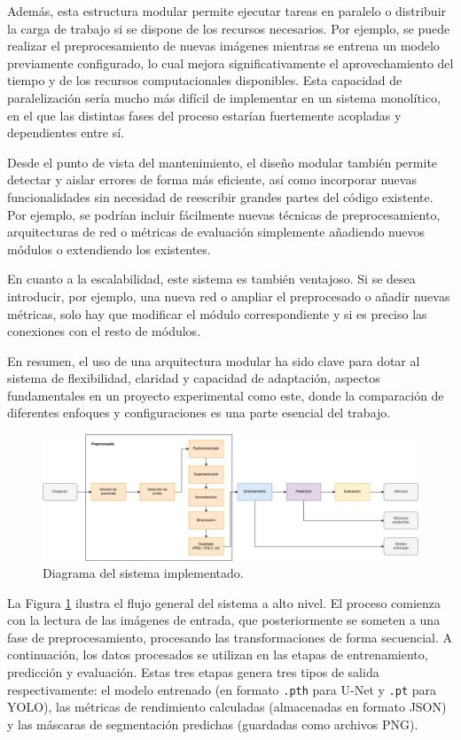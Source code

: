 \documentclass[../main.tex]{subfiles}
\begin{document}
Además, esta estructura modular permite ejecutar tareas en paralelo o distribuir la carga de trabajo si se dispone de los recursos necesarios. Por ejemplo, se puede realizar el preprocesamiento de nuevas imágenes mientras se entrena un modelo previamente configurado, lo cual mejora significativamente el aprovechamiento del tiempo y de los recursos computacionales disponibles. Esta capacidad de paralelización sería mucho más difícil de implementar en un sistema monolítico, en el que las distintas fases del proceso estarían fuertemente acopladas y dependientes entre sí.

Desde el punto de vista del mantenimiento, el diseño modular también permite detectar y aislar errores de forma más eficiente, así como incorporar nuevas funcionalidades sin necesidad de reescribir grandes partes del código existente. Por ejemplo, se podrían incluir fácilmente nuevas técnicas de preprocesamiento, arquitecturas de red o métricas de evaluación simplemente añadiendo nuevos módulos o extendiendo los existentes.

En cuanto a la escalabilidad, este sistema es también ventajoso. Si se desea introducir, por ejemplo, una nueva red o ampliar el preprocesado o añadir nuevas métricas, solo hay que modificar el módulo correspondiente y si es preciso las conexiones con el resto de módulos.

En resumen, el uso de una arquitectura modular ha sido clave para dotar al sistema de flexibilidad, claridad y capacidad de adaptación, aspectos fundamentales en un proyecto experimental como este, donde la comparación de diferentes enfoques y configuraciones es una parte esencial del trabajo.


\begin{figure}
    \centering
    \includegraphics[width=1\textwidth]{imgs/impl/flujo-pipeline.drawio.png}
    \caption{Diagrama del sistema implementado.}
    \label{fig:pipeline-1}
\end{figure}

La Figura \ref{fig:pipeline-1} ilustra el flujo general del sistema a alto nivel. El proceso comienza con la lectura de las imágenes de entrada, que posteriormente se someten a una fase de preprocesamiento, procesando las transformaciones de forma secuencial. A continuación, los datos procesados se utilizan en las etapas de entrenamiento, predicción y evaluación. Estas tres etapas genera tres tipos de salida respectivamente: el modelo entrenado (en formato \texttt{.pth} para U-Net y \texttt{.pt} para YOLO), las métricas de rendimiento calculadas (almacenadas en formato JSON) y las máscaras de segmentación predichas (guardadas como archivos PNG).
\end{document}
